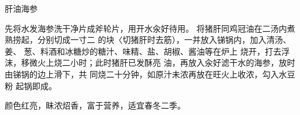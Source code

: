 \begin{recipe}{肝油海参}

\ingredients



\cooking

\step 先将水发海参洗干净片成斧轮片，用开水汆好待用。 将猪肝同鸡冠油在二汤内煮熟捞起，分别切成一寸二 的块〈切猪肝时去筋），一并放入锑锅内，加入清汤、姜、 葱、料酒和冰糖炒的糖汁、味精、盐、胡椒、酱油等在炉上 烧开，打去浮沫，移微火上烧二小时；此时猪肝已发酥亮 油，再放入汆好滤干水的海参，放时由锑锅的边上滑下，共 同烧二十分钟，如原汁未浓再放在旺火上收浓，勾入水豆粉 起锅即成。

\notes

颜色红亮，眛浓炤香，富于营养，适宜春冬二季。

\end{recipe}

